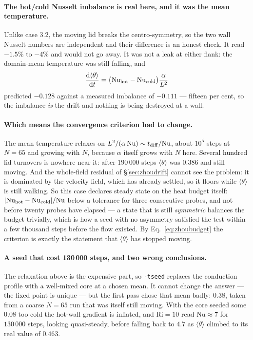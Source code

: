 \documentclass[11pt,a4paper]{article}
\newcommand{\code}[1]{\texttt{\small #1}}
\begin{document}
\paragraph{The hot/cold Nusselt imbalance is real here, and it was the mean
temperature.} Unlike case 3.2, the moving lid breaks the centro-symmetry, so the
two wall Nusselt numbers are independent and their difference is an honest check.
It read $-1.5\%$ to $-4\%$ and would not go away. It was not a leak at either
flank: the domain-mean temperature was still falling, and
\begin{equation}
  \frac{{\rm d}\langle\theta\rangle}{{\rm d}t}
  = \bigl(\mathrm{Nu}_{\rm hot} - \mathrm{Nu}_{\rm cold}\bigr)\frac{\alpha}{L^2}
  \label{eq:zhoubudget}
\end{equation}
predicted $-0.128$ against a measured imbalance of $-0.111$ --- fifteen per cent,
so the imbalance \emph{is} the drift and nothing is being destroyed at a wall.

\paragraph{Which means the convergence criterion had to change.} The mean
temperature relaxes on $L^2/(\alpha\,\mathrm{Nu}) \sim t_{\rm diff}/\mathrm{Nu}$,
about $10^5$ steps at $N=65$ and growing with $N$, because $\alpha$ itself grows
with $N$ here. Several hundred lid turnovers is nowhere near it: after $190\,000$
steps $\langle\theta\rangle$ was $0.386$ and still moving. And the whole-field
residual of \S\ref{sec:zhoudrift} cannot see the problem: it is dominated by the
velocity field, which has already settled, so it floors while
$\langle\theta\rangle$ is still walking. So this case declares steady state on the heat budget
itself: $|\mathrm{Nu}_{\rm hot}-\mathrm{Nu}_{\rm cold}|/\mathrm{Nu}$ below a
tolerance for three consecutive probes, and not before twenty probes have
elapsed --- a state that is still \emph{symmetric} balances the budget trivially,
which is how a seed with no asymmetry satisfied the test within a few thousand
steps before the flow existed. By Eq.~\eqref{eq:zhoubudget} the criterion is
exactly the statement that $\langle\theta\rangle$ has stopped moving.


\paragraph{A seed that cost 130\,000 steps, and two wrong conclusions.} The
relaxation above is the expensive part, so \code{-tseed} replaces the conduction
profile with a well-mixed core at a chosen mean. It cannot change the answer ---
the fixed point is unique --- but the first pass chose that mean badly: $0.38$,
taken from a coarse $N=65$ run that was itself still moving. With the core
seeded some $0.08$ too cold the hot-wall gradient is inflated, and
$\mathrm{Ri}=10$ read $\mathrm{Nu}\approx7$ for $130\,000$ steps, looking
quasi-steady, before falling back to $4.7$ as $\langle\theta\rangle$ climbed to
its real value of $0.463$.
\end{document}
